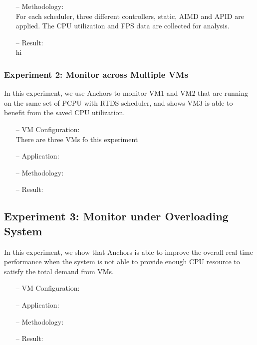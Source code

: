 \begin{itemize}
\item[--] Methodology:\\
For each scheduler, three different controllers, static, AIMD and APID are applied. The CPU utilization and FPS data are collected for analysis.

\item[--] Result:\\
hi
\end{itemize}





\subsubsection{Experiment 2: Monitor across Multiple VMs}

\hfill \linebreak
In this experiment, we use Anchors to monitor VM1 and VM2 that are running on the same set of PCPU with RTDS scheduler, and shows VM3 is able to benefit from the saved CPU utilization.


\begin{itemize} 

\item[--] VM Configuration:\\
There are three VMs fo this experiment 

\item[--] Application:\\
\item[--] Methodology:\\
\item[--] Result:\\

\end{itemize}
\subsection*{Experiment 3: Monitor under Overloading System}


\hfill \linebreak
In this experiment, we show that Anchors is able to improve the overall real-time performance when the system is not able to provide enough CPU resource to satisfy the total demand from VMs.


\begin{itemize} 

\item[--] VM Configuration:\\
\item[--] Application:\\
\item[--] Methodology:\\
\item[--] Result:\\

\end{itemize}



